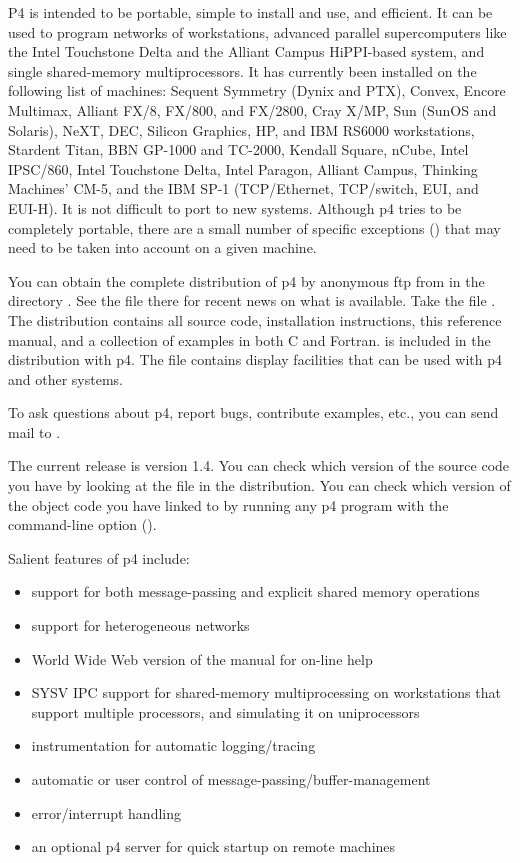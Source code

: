P4 is intended to be portable, simple to install and use, and efficient.  It
can be used to program networks of workstations, advanced parallel
supercomputers like the Intel Touchstone Delta and the Alliant Campus
HiPPI-based system, and single shared-memory multiprocessors.  It has
currently been installed on the following list of machines: Sequent Symmetry
(Dynix and PTX), Convex, Encore Multimax, Alliant FX/8, FX/800, and FX/2800,
Cray X/MP, Sun (SunOS and Solaris), NeXT, DEC, Silicon Graphics, HP, and IBM
RS6000 workstations, Stardent Titan, BBN GP-1000 and TC-2000, Kendall Square,
nCube, Intel IPSC/860, Intel Touchstone Delta, Intel Paragon, Alliant Campus,
Thinking Machines' CM-5, and the IBM SP-1 (TCP/Ethernet, TCP/switch, EUI, and
EUI-H).  It is not difficult to port to new systems.  Although p4 tries to be
completely portable, there are a small number of specific exceptions
() that may need to be taken into account on a
given machine.

You can obtain the complete distribution of p4 by anonymous ftp from
 in the directory .  See the 
file there for recent news on what is available.  Take the file
.  The distribution contains all source code,
installation instructions, this reference manual, and a collection of examples
in both C and Fortran.  is included in the distribution with p4.
The file  contains display facilities that can be used with
p4 and other systems.

To ask questions about p4, report bugs, contribute examples, etc., you can
send mail to .

The current release is version 1.4.  You can check which version of the source
code you have by looking at the file  in the
distribution.  You can check which version of the object code you have linked
to by running any p4 program with the command-line option 
().

Salient features of p4 include: 
\begin{itemize}
\item support for both message-passing and explicit shared memory operations
\item {} support for heterogeneous networks
\item World Wide Web version of the manual for on-line help
\item SYSV IPC support for shared-memory multiprocessing on workstations that
  support multiple processors, and simulating it on uniprocessors
\item instrumentation for automatic logging/tracing
\item automatic or user control of message-passing/buffer-management
\item error/interrupt handling
\item an optional p4 server for quick startup on remote machines
\end{itemize}

